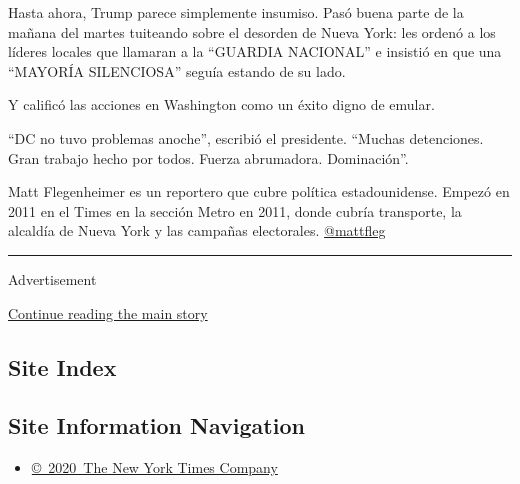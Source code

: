 Hasta ahora, Trump parece simplemente insumiso. Pasó buena parte de la
mañana del martes tuiteando sobre el desorden de Nueva York: les ordenó
a los líderes locales que llamaran a la ``GUARDIA NACIONAL'' e insistió
en que una ``MAYORÍA SILENCIOSA'' seguía estando de su lado.

Y calificó las acciones en Washington como un éxito digno de emular.

``DC no tuvo problemas anoche'', escribió el presidente. ``Muchas
detenciones. Gran trabajo hecho por todos. Fuerza abrumadora.
Dominación''.

Matt Flegenheimer es un reportero que cubre política estadounidense.
Empezó en 2011 en el Times en la sección Metro en 2011, donde cubría
transporte, la alcaldía de Nueva York y las campañas electorales.
\href{https://twitter.com/mattfleg}{@mattfleg}

\begin{center}\rule{0.5\linewidth}{\linethickness}\end{center}

Advertisement

\protect\hyperlink{after-bottom}{Continue reading the main story}

\hypertarget{site-index}{%
\subsection{Site Index}\label{site-index}}

\hypertarget{site-information-navigation}{%
\subsection{Site Information
Navigation}\label{site-information-navigation}}

\begin{itemize}
\tightlist
\item
  \href{https://help.nytimes.com/hc/en-us/articles/115014792127-Copyright-notice}{©~2020~The
  New York Times Company}
\end{itemize}

